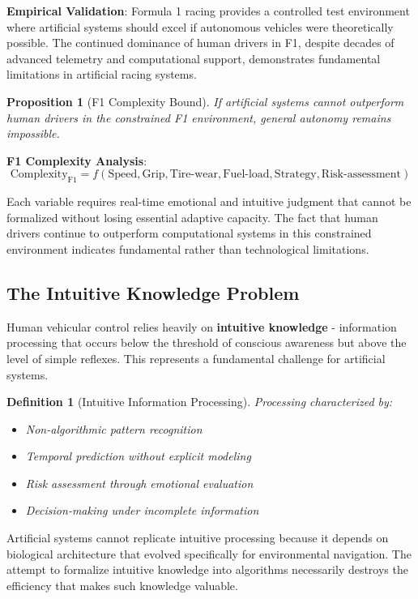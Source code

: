 \documentclass[12pt,a4paper]{article}
\newtheorem{proposition}[theorem]{Proposition}
\newtheorem{definition}[theorem]{Definition}
\begin{document}
\textbf{Empirical Validation}: Formula 1 racing provides a controlled test environment where artificial systems should excel if autonomous vehicles were theoretically possible. The continued dominance of human drivers in F1, despite decades of advanced telemetry and computational support, demonstrates fundamental limitations in artificial racing systems.

\begin{proposition}[F1 Complexity Bound]
If artificial systems cannot outperform human drivers in the constrained F1 environment, general autonomy remains impossible.
\end{proposition}

\textbf{F1 Complexity Analysis}:
$$\text{Complexity}_{\text{F1}} = f(\text{Speed}, \text{Grip}, \text{Tire-wear}, \text{Fuel-load}, \text{Strategy}, \text{Risk-assessment})$$

Each variable requires real-time emotional and intuitive judgment that cannot be formalized without losing essential adaptive capacity. The fact that human drivers continue to outperform computational systems in this constrained environment indicates fundamental rather than technological limitations.

\subsection{The Intuitive Knowledge Problem}

Human vehicular control relies heavily on \textbf{intuitive knowledge} - information processing that occurs below the threshold of conscious awareness but above the level of simple reflexes. This represents a fundamental challenge for artificial systems.

\begin{definition}[Intuitive Information Processing]
Processing characterized by:
\begin{itemize}
\item Non-algorithmic pattern recognition
\item Temporal prediction without explicit modeling
\item Risk assessment through emotional evaluation
\item Decision-making under incomplete information
\end{itemize}
\end{definition}

Artificial systems cannot replicate intuitive processing because it depends on biological architecture that evolved specifically for environmental navigation. The attempt to formalize intuitive knowledge into algorithms necessarily destroys the efficiency that makes such knowledge valuable.
\end{document}
